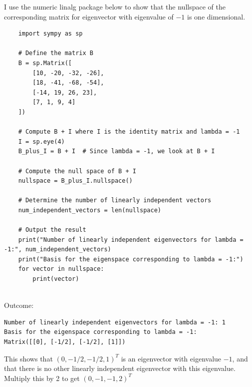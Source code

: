 \documentclass{article}
\begin{document}
I use the numeric linalg package below to show
that the nullspace of the corresponding matrix for
eigenvector with eigenvalue of $-1$ is one dimensional.
\begin{lstlisting}
    import sympy as sp

    # Define the matrix B
    B = sp.Matrix([
        [10, -20, -32, -26],
        [18, -41, -68, -54],
        [-14, 19, 26, 23],
        [7, 1, 9, 4]
    ])
    
    # Compute B + I where I is the identity matrix and lambda = -1
    I = sp.eye(4)
    B_plus_I = B + I  # Since lambda = -1, we look at B + I
    
    # Compute the null space of B + I
    nullspace = B_plus_I.nullspace()
    
    # Determine the number of linearly independent vectors
    num_independent_vectors = len(nullspace)
    
    # Output the result
    print("Number of linearly independent eigenvectors for lambda = -1:", num_independent_vectors)
    print("Basis for the eigenspace corresponding to lambda = -1:")
    for vector in nullspace:
        print(vector)
        
\end{lstlisting}

Outcome:
\begin{verbatim}
Number of linearly independent eigenvectors for lambda = -1: 1
Basis for the eigenspace corresponding to lambda = -1:
Matrix([[0], [-1/2], [-1/2], [1]])
\end{verbatim}

This shows that $(0, -1/2, -1/2, 1)^T$ is an eigenvector with eigenvalue $-1$,
and that there is no other linearly independent eigenvector with this eigenvalue.
Multiply this by 2 to get $(0,-1,-1,2)^T$
\end{document}

